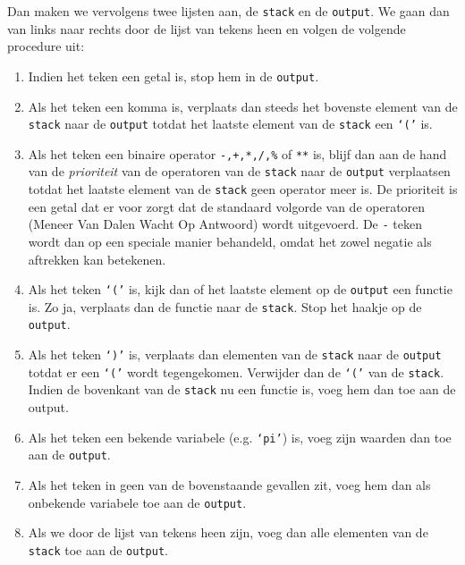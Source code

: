 \documentclass[a4paper]{article}
\newcommand{\ttt}[1]{\texttt{#1}}
\begin{document}
Dan maken we vervolgens twee lijsten aan, de \ttt{stack} en de \ttt{output}. We gaan dan van links naar rechts door de lijst van tekens heen en volgen de volgende procedure uit:
\begin{enumerate}
\item Indien het teken een getal is, stop hem in de \ttt{output}.
\item Als het teken een komma is, verplaats dan steeds het bovenste element van de \ttt{stack} naar de \ttt{output} totdat het laatste element van de \ttt{stack} een \ttt{`('} is.
\item Als het teken een binaire operator \ttt{-,+,*,/,\%} of \ttt{**} is,  blijf dan aan de hand van de \textit{prioriteit} van de operatoren van de \ttt{stack} naar de \ttt{output} verplaatsen totdat het laatste element van de \ttt{stack} geen operator meer is. De prioriteit is een getal dat er voor zorgt dat de standaard volgorde van de operatoren (Meneer Van Dalen Wacht Op Antwoord) wordt uitgevoerd. De \ttt- teken wordt dan op een speciale manier behandeld, omdat het zowel negatie als aftrekken kan betekenen.
\item Als het teken \ttt{`('} is, kijk dan of het laatste element op de \ttt{output} een functie is. Zo ja, verplaats dan de functie naar de \ttt{stack}. Stop het haakje op de \ttt{output}.
\item Als het teken \ttt{`)'} is, verplaats dan elementen van de \ttt{stack} naar de \ttt{output} totdat er een \ttt{`('} wordt tegengekomen. Verwijder dan de \ttt{`('} van de \ttt{stack}. Indien de bovenkant van de \ttt{stack} nu een functie is, voeg hem dan toe aan de output.
\item Als het teken een bekende variabele (e.g. \ttt{`pi'}) is, voeg zijn waarden dan toe aan de \ttt{output}.
\item Als het teken in geen van de bovenstaande gevallen zit, voeg hem dan als onbekende variabele toe aan de \ttt{output}.
\item Als we door de lijst van tekens heen zijn, voeg dan alle elementen van de \ttt{stack} toe aan de \ttt{output}.
\end{enumerate}
\end{document}
